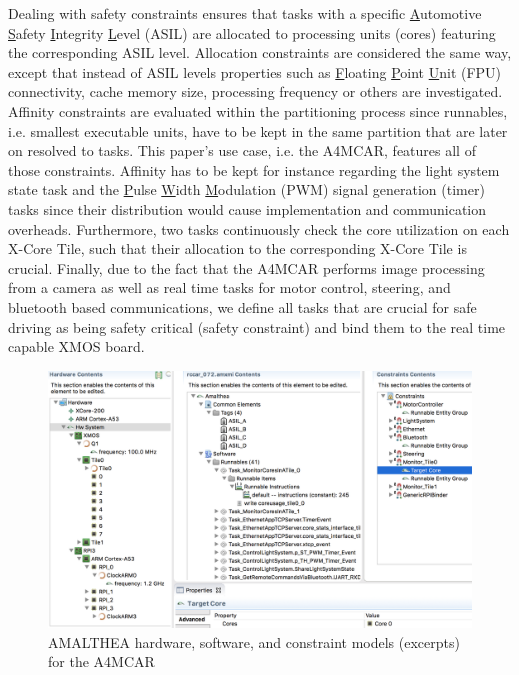 \documentclass [a4paper,final,conference,10pt]{IDAACS}
\begin{document}
Dealing with safety constraints ensures that tasks with a specific \underline{A}utomotive \underline{S}afety \underline{I}ntegrity \underline{L}evel (ASIL) are allocated to processing units (cores) featuring the corresponding ASIL level. Allocation constraints are considered the same way, except that instead of ASIL levels properties such as \underline{F}loating \underline{P}oint \underline{U}nit (FPU) connectivity, cache memory size, processing frequency or others are investigated. Affinity constraints are evaluated within the partitioning process since runnables, i.e. smallest executable units, have to be kept in the same partition that are later on resolved to tasks. This paper's use case, i.e. the A4MCAR, features all of those constraints. Affinity has to be kept for instance regarding the light system state task and the \underline{P}ulse \underline{W}idth \underline{M}odulation (PWM) signal generation (timer) tasks since their distribution would cause implementation and communication overheads. Furthermore, two tasks continuously check the core utilization on each X-Core Tile, such that their allocation to the corresponding X-Core Tile is crucial. Finally, due to the fact that the A4MCAR performs image processing from a camera as well as real time tasks for motor control, steering, and bluetooth based communications, we define all tasks that are crucial for safe driving as being safety critical (safety constraint) and bind them to the real time capable XMOS board. 
\begin{figure}[h!]
	\centering
	\includegraphics[scale=0.265]{images/models2.png}
	\caption{\label{fig:model}AMALTHEA hardware, software, and constraint models (excerpts) for the A4MCAR}
\end{figure}

\end{document}
